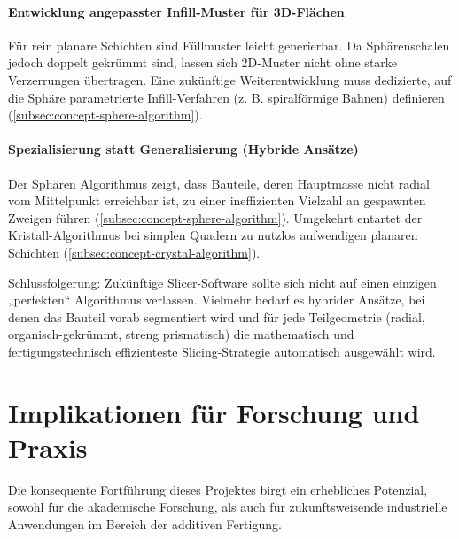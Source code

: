       \paragraph{Entwicklung angepasster Infill-Muster für 3D-Flächen}
        Für rein planare Schichten sind Füllmuster leicht generierbar.
        Da Sphärenschalen jedoch doppelt gekrümmt sind, lassen sich 2D-Muster nicht ohne starke Verzerrungen übertragen.
        Eine zukünftige Weiterentwicklung muss dedizierte, auf die Sphäre parametrierte Infill-Verfahren (z. B. spiralförmige Bahnen) definieren (\ref{subsec:concept-sphere-algorithm}).

      \paragraph{Spezialisierung statt Generalisierung (Hybride Ansätze)}
        Der Sphären Algorithmus zeigt, dass Bauteile, deren Hauptmasse nicht radial vom Mittelpunkt erreichbar ist, zu einer ineffizienten Vielzahl an gespawnten Zweigen führen (\ref{subsec:concept-sphere-algorithm}).
        Umgekehrt entartet der Kristall-Algorithmus bei simplen Quadern zu nutzlos aufwendigen planaren Schichten (\ref{subsec:concept-crystal-algorithm}).

      Schlussfolgerung: Zukünftige Slicer-Software sollte sich nicht auf einen einzigen „perfekten“ Algorithmus verlassen.
      Vielmehr bedarf es hybrider Ansätze, bei denen das Bauteil vorab segmentiert wird und für jede Teilgeometrie (radial, organisch-gekrümmt, streng prismatisch) die mathematisch und fertigungstechnisch effizienteste Slicing-Strategie automatisch ausgewählt wird.

  \section{Implikationen für Forschung und Praxis}\label{sec:implications-for-research-and-practice}
    Die konsequente Fortführung dieses Projektes birgt ein erhebliches Potenzial, sowohl für die akademische Forschung, als auch für zukunftsweisende industrielle Anwendungen im Bereich der additiven Fertigung.

